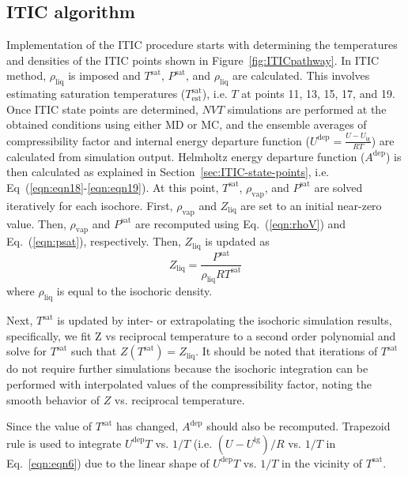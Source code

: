 \documentclass[5p,times]{elsarticle}
\begin{document}
\subsection{ITIC algorithm}
Implementation of the ITIC procedure starts with determining the temperatures and densities of the ITIC points shown in Figure~\ref{fig:ITICpathway}. In ITIC method, $\rho_\mathrm{liq}$ is imposed and $T^\mathrm{sat}$, $P^\mathrm{sat}$, and $\rho_\mathrm{liq}$ are calculated. This involves estimating saturation temperatures ($T^\mathrm{sat}_\mathrm{est}$), i.e. $T$ at points 11, 13, 15, 17, and 19. Once ITIC state points are determined, $NVT$ simulations are performed at the obtained conditions using either MD or MC, and the ensemble averages of compressibility factor and internal energy departure function ($U^\mathrm{dep}=\frac{U-U_\mathrm{ig}}{RT}$) are calculated from simulation output. Helmholtz energy departure function ($A^\mathrm{dep}$) is then calculated as explained in Section~\ref{sec:ITIC-state-points}, i.e. Eq~(\ref{eqn:eqn18}-\ref{eqn:eqn19}). At this point, $T^\mathrm{sat}$, $\rho_\mathrm{vap}$, and $P^\mathrm{sat}$ are solved iteratively for each isochore. First, $\rho_\mathrm{vap}$ and $Z_\mathrm{liq}$ are set to an initial near-zero value. Then, $\rho_\mathrm{vap}$ and $P^\mathrm{sat}$ are recomputed using Eq.~(\ref{eqn:rhoV}) and Eq.~(\ref{eqn:psat}), respectively. Then, $Z_\mathrm{liq}$ is updated as 
\begin{equation}
{Z_{\mathrm{liq}}} = \frac{P^\mathrm{sat}}{\rho_\mathrm{liq}RT^\mathrm{sat}}  
\label{eqn:zliq}
\end{equation}
where $\rho_\mathrm{liq}$ is equal to the isochoric density.

Next, $T^\mathrm{sat}$ is updated by inter- or extrapolating the isochoric simulation results, specifically, we fit Z vs reciprocal temperature to a second order polynomial and solve for $T^\mathrm{sat}$ such that $Z(T^\mathrm{sat})=Z_\mathrm{liq}$. It should be noted that iterations of $T^\mathrm{sat}$ do not require further simulations because the isochoric integration can be performed with interpolated values of the compressibility factor, noting the smooth behavior of $Z$ vs. reciprocal temperature.

Since the value of $T^\mathrm{sat}$ has changed, $A^\mathrm{dep}$ should also be recomputed. Trapezoid rule is used to integrate $U^\mathrm{dep}T$ vs. $1/T$ (i.e. $(U-U^\mathrm{ig})/R$ vs. $1/T$ in Eq.~\ref{eqn:eqn6}) due to the linear shape of $U^\mathrm{dep}T$ vs. $1/T$ in the vicinity of $T^\mathrm{sat}$.
\end{document}
